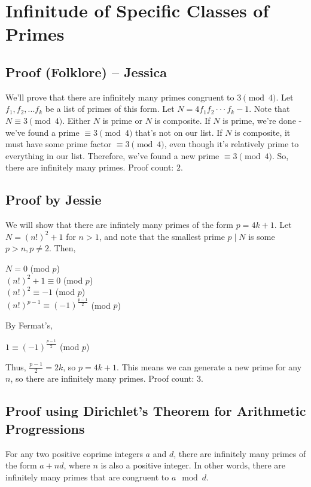 \documentclass[12pt]{scrartcl}
\begin{document}
\section*{Infinitude of Specific Classes of Primes}

\subsection*{Proof (Folklore) -- Jessica}
We'll prove that there are infinitely many primes congruent to $3\pmod{4}$. Let $f_1, f_2, ... f_k$ be a list of primes of this form. Let $N = 4 f_1 f_2 \cdot \cdot \cdot f_k - 1$. Note that $N \equiv 3 \pmod{4}$. Either $N$ is prime or $N$ is composite. If $N$ is prime, we're done - we've found a prime $\equiv 3 \pmod{4}$ that's not on our list. If $N$ is composite, it must have some prime factor $\equiv 3 \pmod{4}$, even though it's relatively prime to everything in our list. Therefore, we've found a new prime $\equiv 3 \pmod{4}$. So, there are infinitely many primes.
Proof count: $2$.


\subsection*{Proof by Jessie}
We will show that there are infintely many primes of the form $p=4k+1$. Let $N=(n!)^2+1$ for $n>1$, and note that the smallest prime $p \mid N$ is some $p > n, p \neq 2$.
Then,
\begin{center}
	$N=0$ (mod $p$)\\
	$(n!)^2+1\equiv0$ (mod $p$)\\
	$(n!)^2\equiv-1$ (mod $p$)\\
	$(n!)^{p-1}\equiv(-1)^{\frac{p-1}{2}}$ (mod $p$)\\
\end{center}
By Fermat's,
\begin{center}
	$1\equiv(-1)^{\frac{p-1}{2}}$ (mod $p$)
\end{center}
Thus, $\frac{p-1}{2}=2k$, so $p=4k+1$. This means we can generate a new prime for any $n$, so there are infinitely many primes. Proof count: $3$.

\subsection*{Proof using Dirichlet's Theorem for Arithmetic Progressions}
For any two positive coprime integers $a$ and $d$, there are infinitely many primes of the form $a + nd$, where $n$ is also a positive integer. In other words, there are infinitely many primes that are congruent to $a \mod d$.
\end{document}
